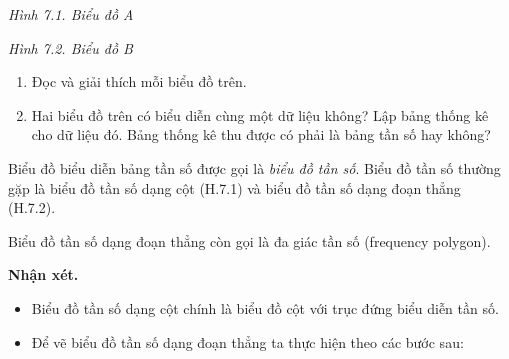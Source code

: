 \begin{lesson}
\begin{center}
    \textit{Hình 7.1. Biểu đồ A}
    \end{center}

    \begin{center}

    \textit{Hình 7.2. Biểu đồ B}
    \end{center}

    \begin{enumerate}[label=\alph*)]
        \item Đọc và giải thích mỗi biểu đồ trên.
        \item Hai biểu đồ trên có biểu diễn cùng một dữ liệu không? Lập bảng thống kê cho dữ liệu đó. Bảng thống kê thu được có phải là bảng tần số hay không?
    \end{enumerate}

    \answerline
    \answerline

    \begin{keyconcept}
        Biểu đồ biểu diễn bảng tần số được gọi là \textit{biểu đồ tần số}. Biểu đồ tần số thường gặp là biểu đồ tần số dạng cột (H.7.1) và biểu đồ tần số dạng đoạn thẳng (H.7.2).
    \end{keyconcept}

    Biểu đồ tần số dạng đoạn thẳng còn gọi là đa giác tần số \allowbreak(frequency polygon).

    \textbf{Nhận xét.}
    \begin{itemize}
        \item Biểu đồ tần số dạng cột chính là biểu đồ cột với trục đứng biểu diễn tần số.
        \item Để vẽ biểu đồ tần số dạng đoạn thẳng ta thực hiện theo các bước sau:
    \end{itemize}


\end{lesson}
